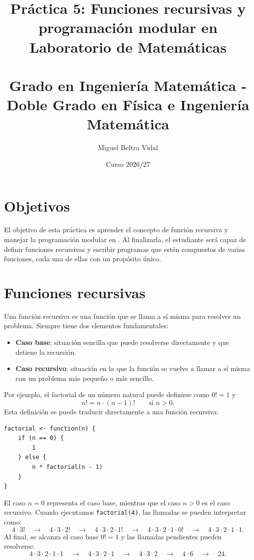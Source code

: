 \documentclass[11pt,a4paper]{article}
\title{\LARGE \textbf{Práctica 5: Funciones recursivas y programación modular en \R} \\[0.5em]
\Large Laboratorio de Matemáticas \\
\small \ \\
Grado en Ingeniería Matemática - Doble Grado en Física e Ingeniería Matemática}
\author{Miguel Beltra Vidal}
\date{Curso 2026/27}
\newcommand{\R}{\textcolor{azuluc}{\faIcon{r-project}}}
\theoremstyle{exercise}
\begin{document}
\maketitle

\section{Objetivos}

El objetivo de esta práctica es aprender el concepto de función recursiva y manejar la programación modular en \R. Al finalizarla, el estudiante será capaz de definir funciones recursivas y escribir programas que estén compuestos de varias funciones, cada una de ellas con un propósito único.


\section{Funciones recursivas} 

Una función recursiva es una función que se llama a sí misma para resolver un problema. Siempre tiene dos elementos fundamentales:

\begin{itemize}
	\item \textbf{Caso base}: situación sencilla que puede resolverse directamente y que detiene la recursión.
	\item \textbf{Caso recursivo}: situación en la que la función se vuelve a llamar a sí misma con un problema más pequeño o más sencillo. 
\end{itemize}
Por ejemplo, el factorial de un número natural puede definirse como $0! = 1$ y 
\[ n! = n \cdot (n-1)! \qquad \text{si } n>0. \]
Esta definición se puede traducir directamente a una función recursiva:
\begin{lstlisting}[style=rstyle] 
factorial <- function(n) { 
	if (n == 0) { 
		1 
	} else { 
		n * factorial(n - 1) 
	} 
} 
\end{lstlisting}

El caso $n=0$ representa el caso base, mientras que el caso $n>0$ es el caso recursivo. Cuando ejecutamos \texttt{factorial(4)}, las llamadas se pueden interpretar como: 
\[ 
4\cdot 3! 
\quad 
\rightarrow
\quad 
4 \cdot 3 \cdot 2!
\quad
\rightarrow
\quad
4 \cdot 3 \cdot 2 \cdot 1!
\quad
\rightarrow
\quad
4 \cdot 3 \cdot 2 \cdot 1 \cdot 0! 
\quad
\rightarrow
\quad
4 \cdot 3 \cdot 2 \cdot 1 \cdot 1. 
\]
Al final, se alcanza el caso base $0!=1$ y las llamadas pendientes pueden resolverse:
\[ 
4 \cdot 3 \cdot 2 \cdot 1 \cdot 1
\quad 
\rightarrow
\quad 
4 \cdot 3 \cdot 2 \cdot 1
\quad 
\rightarrow
\quad 
4 \cdot 3 \cdot 2
\quad 
\rightarrow
\quad 
4 \cdot 6
\quad 
\rightarrow
\quad 
24.
\]
\medskip
\end{document}
